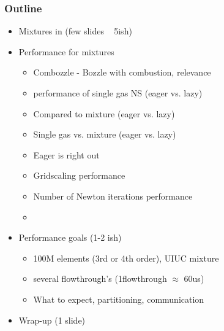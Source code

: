 \def\CC{{C\nolinebreak[4]\hspace{-.05em}\raisebox{.4ex}{\tiny\bf ++}}}


\begin{frame}\frametitle{Outline}
\begin{itemize}
   \item Mixtures in \mirgecom (few slides ~ 5ish)
   \item \mirgecom Performance for mixtures
   \begin{itemize}
      \item Combozzle - Bozzle with combustion, relevance
      \item \mirgecom performance of single gas NS (eager vs. lazy)
      \item Compared to mixture (eager vs. lazy)
      \item Single gas vs. mixture (eager vs. lazy)
      \item Eager is right out 
      \item Gridscaling performance
      \item Number of Newton iterations performance
      \item 
   \end{itemize}
   \item Performance goals (1-2 ish)
   \begin{itemize}
      \item 100M elements (3rd or 4th order), UIUC mixture
      \item several flowthrough's (1flowthrough $\approx$ 60us)
      \item What to expect, partitioning, communication
   \end{itemize}
\item Wrap-up (1 slide)
\end{itemize}
\end{frame}

